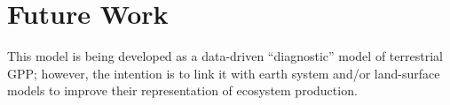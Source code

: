 %
%
%
%
%
\section{Future Work}
\label{sec:future}
This model is being developed as a data-driven ``diagnostic'' model of terrestrial GPP; however, the intention is to link it with earth system and/or land-surface models to improve their representation of ecosystem production.